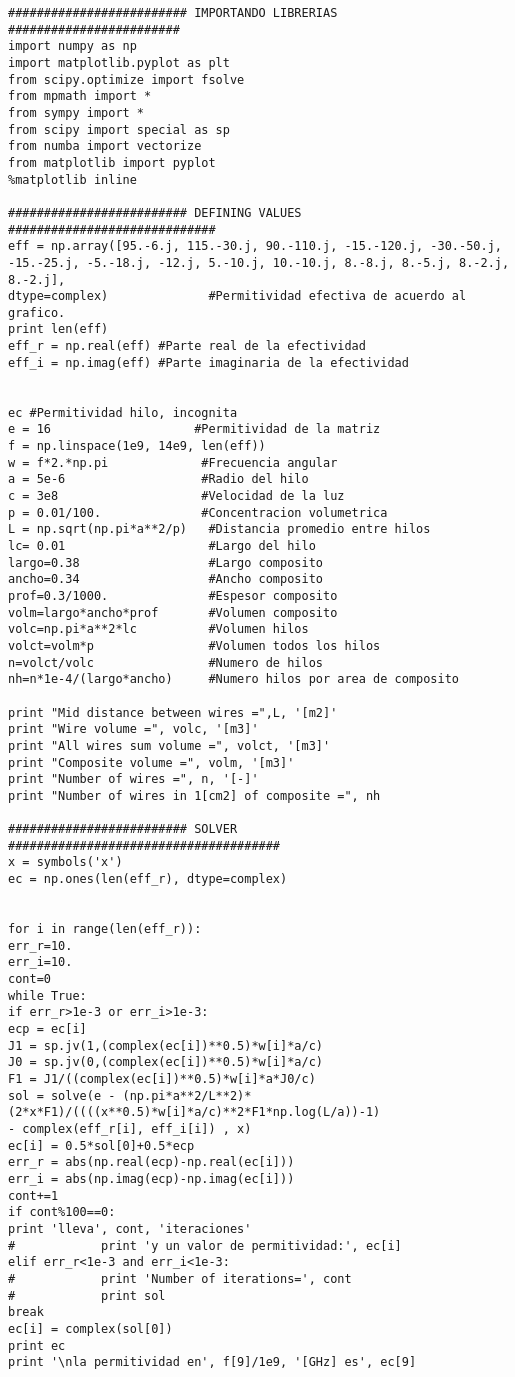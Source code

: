 \documentclass[12pt,letterpaper]{report}
\numberwithin{equation}{section}
\begin{document}
\begin{lstlisting}
######################### IMPORTANDO LIBRERIAS ########################
import numpy as np
import matplotlib.pyplot as plt
from scipy.optimize import fsolve
from mpmath import *
from sympy import *
from scipy import special as sp
from numba import vectorize
from matplotlib import pyplot
%matplotlib inline

######################### DEFINING VALUES #############################
eff = np.array([95.-6.j, 115.-30.j, 90.-110.j, -15.-120.j, -30.-50.j, -15.-25.j, -5.-18.j, -12.j, 5.-10.j, 10.-10.j, 8.-8.j, 8.-5.j, 8.-2.j, 8.-2.j],
dtype=complex)              #Permitividad efectiva de acuerdo al grafico.
print len(eff)
eff_r = np.real(eff) #Parte real de la efectividad
eff_i = np.imag(eff) #Parte imaginaria de la efectividad


ec #Permitividad hilo, incognita
e = 16                    #Permitividad de la matriz
f = np.linspace(1e9, 14e9, len(eff))
w = f*2.*np.pi             #Frecuencia angular
a = 5e-6                   #Radio del hilo
c = 3e8                    #Velocidad de la luz
p = 0.01/100.              #Concentracion volumetrica
L = np.sqrt(np.pi*a**2/p)   #Distancia promedio entre hilos
lc= 0.01                    #Largo del hilo
largo=0.38                  #Largo composito
ancho=0.34                  #Ancho composito
prof=0.3/1000.              #Espesor composito
volm=largo*ancho*prof       #Volumen composito
volc=np.pi*a**2*lc          #Volumen hilos
volct=volm*p                #Volumen todos los hilos
n=volct/volc                #Numero de hilos
nh=n*1e-4/(largo*ancho)     #Numero hilos por area de composito

print "Mid distance between wires =",L, '[m2]'
print "Wire volume =", volc, '[m3]'
print "All wires sum volume =", volct, '[m3]'
print "Composite volume =", volm, '[m3]'
print "Number of wires =", n, '[-]'
print "Number of wires in 1[cm2] of composite =", nh

######################### SOLVER ######################################
x = symbols('x')
ec = np.ones(len(eff_r), dtype=complex)


for i in range(len(eff_r)):
err_r=10.
err_i=10.
cont=0
while True:
if err_r>1e-3 or err_i>1e-3:
ecp = ec[i]
J1 = sp.jv(1,(complex(ec[i])**0.5)*w[i]*a/c)
J0 = sp.jv(0,(complex(ec[i])**0.5)*w[i]*a/c)
F1 = J1/((complex(ec[i])**0.5)*w[i]*a*J0/c)
sol = solve(e - (np.pi*a**2/L**2)*(2*x*F1)/((((x**0.5)*w[i]*a/c)**2*F1*np.log(L/a))-1)
- complex(eff_r[i], eff_i[i]) , x)
ec[i] = 0.5*sol[0]+0.5*ecp
err_r = abs(np.real(ecp)-np.real(ec[i]))
err_i = abs(np.imag(ecp)-np.imag(ec[i]))
cont+=1
if cont%100==0:
print 'lleva', cont, 'iteraciones'
#            print 'y un valor de permitividad:', ec[i]
elif err_r<1e-3 and err_i<1e-3:
#            print 'Number of iterations=', cont
#            print sol
break
ec[i] = complex(sol[0])
print ec
print '\nla permitividad en', f[9]/1e9, '[GHz] es', ec[9] 

\end{lstlisting}
\end{document}
